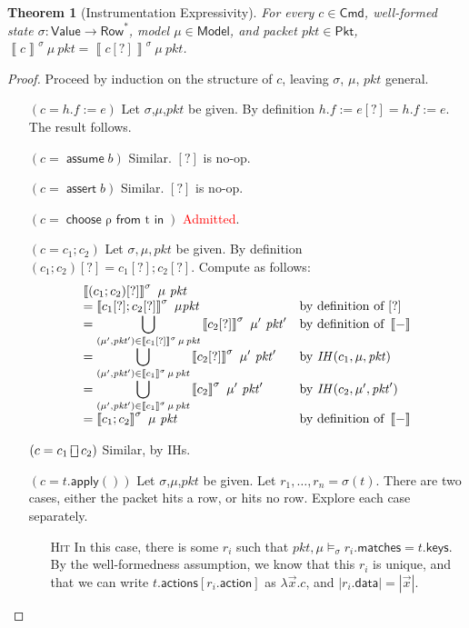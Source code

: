 \documentclass{article}
\newcommand{\pkt}{\mathit{pkt}}
\newcommand{\denote}[1]{\left\llbracket#1\right\rrbracket}
\newcommand{\Value}{\mathsf{Value}}
\newcommand{\Cmd}{\mathsf{Cmd}}
\newcommand{\Pkt}{\mathsf{Pkt}}
\newcommand{\Model}{\mathsf{Model}}
\newcommand{\Row}{\mathsf{Row}}
\newcommand{\matches}{\mathsf{matches}}
\newcommand{\action}{\mathsf{action}}
\newcommand{\actions}{\mathsf{actions}}
\newcommand{\keys}{\mathsf{keys}}
\newcommand{\data}{\mathsf{data}}
\newcommand{\assert}{\mathop{\mathsf{assert}}}
\newcommand{\assume}{\mathop{\mathsf{assume}}}
\newcommand{\apply}{\mathsf{apply}}
\newcommand{\choiceop}{\rotatebox[origin=c]{90}{$\sqsubset\!\!\!\sqsupset$}}
\newcommand{\choice}{\mathbin{\choiceop}}
\renewcommand{\choose}[2]{\mathop{\mathsf{choose}~#1~\mathsf{from}~#2~\mathsf{in}}}
\newtheorem{theorem}{Theorem}
\begin{document}
\begin{theorem}[Instrumentation Expressivity]
  For every $c \in \Cmd$, well-formed state $\sigma : \Value \to \Row^*$, model
  $\mu \in \Model$, and packet $\pkt \in \Pkt$, $\denote{c}^\sigma~\mu~\pkt =
  \denote{c[?]}^\sigma~\mu~\pkt$.
\end{theorem}

\begin{proof}
  Proceed by induction on the structure of $c$, leaving $\sigma$, $\mu$, $\pkt$ general.
  \begin{enumerate}[align=left]
  \item[$(c = h.f := e)$]
    Let $\sigma$,$\mu$,$\pkt$ be given.
    By definition $h.f:=e[?] = h.f:=e$. The result follows.
  \item[$(c = \assume b)$] Similar. $[?]$ is no-op.
  \item[$(c = \assert b)$] Similar. $[?]$ is no-op.
  \item[$(c = \choose \rho t)$] \textcolor{red}{Admitted}.
  \item[$(c = c_1;c_2)$]
    Let $\sigma,\mu,\pkt$ be given.
    By definition $(c_1;c_2)[?] = c_1[?]; c_2[?]$.
    Compute as follows:
    \[\begin{array}{>{\displaystyle}ll}
    \denote{(c_1;c_2)[?]}^\sigma~\mu~\pkt \\
    = \denote{c_1[?];c_2[?]}^\sigma~\mu\pkt
    & \text{by definition of } [?]  \\
    = \bigcup_{(\mu',\pkt') \in \denote{c_1[?]}^\sigma\,\mu\,\pkt}\denote{c_2[?]}^\sigma~\mu'~\pkt'
    & \text{by definition of }\denote{-} \\
    = \bigcup_{(\mu',\pkt') \in \denote{c_1}^\sigma\,\mu\,\pkt}\denote{c_2[?]}^\sigma~\mu'~\pkt'
    & \text{by } \mathit{IH}(c_1, \mu, \pkt) \\
    = \bigcup_{(\mu',\pkt') \in \denote{c_1}^\sigma\,\mu\,\pkt}\denote{c_2}^\sigma~\mu'~\pkt'
    & \text{by } \mathit{IH}(c_2, \mu', \pkt') \\
    = \denote{c_1;c_2}^\sigma~\mu~\pkt
    & \text{by definition of } \denote{-}
    \end{array}
    \]
  \item[$(c = c_1 \choice c_2)$] Similar, by IHs.

  \item[$(c = t.\apply())$]
    Let $\sigma$,$\mu$,$\pkt$ be given.
    Let $r_1,\ldots,r_n = \sigma(t)$.
    There are two cases, either the packet hits a row, or hits no row. Explore each case separately.
    \begin{enumerate}
    \item[\textsc{Hit}] In this case, there is some $r_i$ such that $\pkt,\mu
      \models_\sigma r_i.\matches = t.\keys$. By the well-formedness assumption,
      we know that this $r_i$ is unique, and that we can write
      $t.\actions[r_i.\action]$ as $\lambda \vec x. c$, and $|r_i.\data| = |\vec x|$.


\end{enumerate}
\end{enumerate}
\end{proof}
\end{document}
